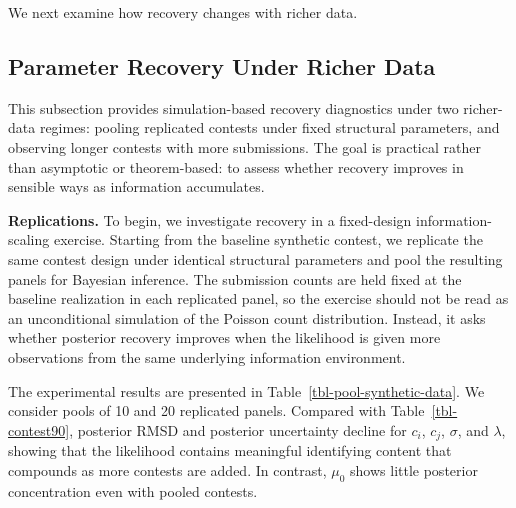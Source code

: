 \documentclass[mnsc]{informs3}
\begin{document}
We next examine how recovery changes with richer data.


\subsection{Parameter Recovery Under Richer Data}

This subsection provides simulation-based recovery diagnostics under two richer-data regimes: pooling replicated contests under fixed structural parameters, and observing longer contests with more submissions.
The goal is practical rather than asymptotic or theorem-based: to assess whether recovery improves in sensible ways as information accumulates.


\textbf{Replications.}
To begin, we investigate recovery in a fixed-design information-scaling exercise.
Starting from the baseline synthetic contest, we replicate the same contest design under identical structural parameters and pool the resulting panels for Bayesian inference.
The submission counts are held fixed at the baseline realization in each replicated panel, so the exercise should not be read as an unconditional simulation of the Poisson count distribution.
Instead, it asks whether posterior recovery improves when the likelihood is given more observations from the same underlying information environment.

The experimental results are presented in Table~\ref{tbl-pool-synthetic-data}.
We consider pools of 10 and 20 replicated panels.
Compared with Table~\ref{tbl-contest90}, posterior RMSD and posterior uncertainty decline for $c_i$, $c_j$, $\sigma$, and $\lambda$, showing that the likelihood contains meaningful identifying content that compounds as more contests are added.
In contrast, $\mu_0$ shows little posterior concentration even with pooled contests.
\end{document}
